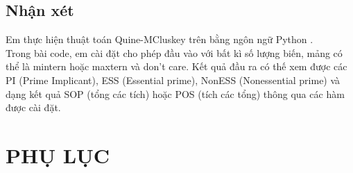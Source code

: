 \documentclass[titlepage]{article} %
\begin{document}
\begin{enumerate}
\end{enumerate}

\subsection{Nhận xét}
\hspace{0.4cm} 
Em thực hiện thuật toán Quine-MCluskey \cite{QM:2020} trên bằng ngôn ngữ Python \cite{Python:Ref}. \\
Trong bài code, em cài đặt cho phép đầu vào với bất kì số lượng biến, mảng có thể là mintern hoặc maxtern và don't care. Kết quả đầu ra có thế xem được các PI (Prime Implicant), ESS (Essential prime), NonESS (Nonessential prime) và dạng kết quả SOP (tổng các tích) hoặc POS (tích các tổng) thông qua các hàm được cài đặt.


\newpage


\section*{\centering PHỤ LỤC}
\end{document}
